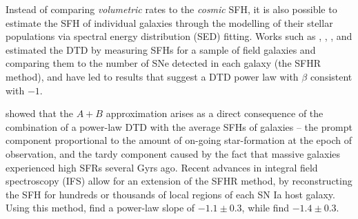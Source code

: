 \documentclass[fleqn,usenatbib]{mnras}
\providecommand{\DIFadd}[1]{\protect\cbstart{#1}\protect\cbend} %
\providecommand{\DIFaddbegin}{} %
\providecommand{\DIFaddend}{} %
\newcommand{\DIFaddincludegraphics}[2][]{{\color{blue}\fbox{\DIFOincludegraphics[#1]{#2}}}} %
\DeclareRobustCommand{\DIFaddbegin}{\DIFOaddbegin \let\includegraphics\DIFaddincludegraphics} %
\DeclareRobustCommand{\DIFaddend}{\DIFOaddend \let\includegraphics\DIFOincludegraphics} %
\begin{document}
Instead of comparing \textit{volumetric} rates to the \textit{cosmic} SFH, it is also possible to estimate the SFH of individual galaxies through the modelling of their stellar populations via spectral energy distribution (SED) fitting. Works such as \DIFaddbegin \DIFadd{\citet{Totani2008}, }\DIFaddend \citet{Maoz2011}, \citet{Maoz2012}, \citet{Graur2013}, and \citet{Graur2015} estimated the DTD by measuring SFHs for a sample of field galaxies and comparing them to the number of SNe detected in each galaxy (the SFHR method), and have led to results that suggest a DTD power law with $\beta$ consistent with $-1$. 

\citet[][hereafter C14]{Childress2014} showed that the $A+B$ approximation arises as a direct consequence of the combination of a power-law DTD with the average SFHs of galaxies -- the prompt component proportional to the amount of on-going star-formation at the epoch of observation, and the tardy component caused by the fact that massive galaxies experienced high SFRs several Gyrs ago. Recent advances in integral field spectroscopy (IFS) allow for an extension of the SFHR method, by reconstructing the SFH for hundreds or thousands of local regions of each SN Ia host galaxy. Using this method, \citet{Castrillo2020} find a power-law slope of $-1.1\pm0.3$, while \citet{Chen2021} find $-1.4\pm0.3$.
\end{document}
